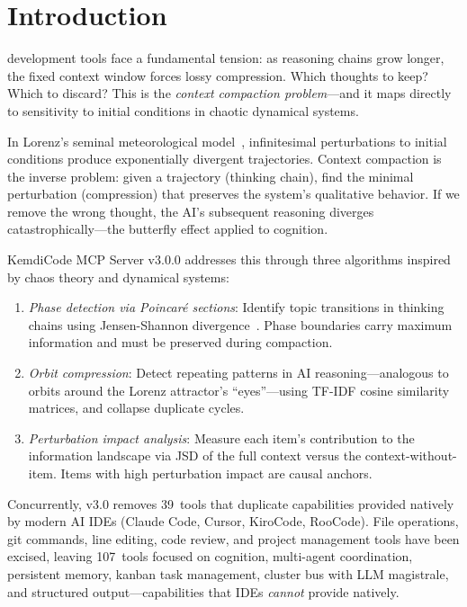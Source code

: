 \documentclass[journal,10pt]{IEEEtran}
\begin{document}
\section{Introduction}
\label{sec:intro}

 development tools face a fundamental tension: as reasoning chains grow longer, the fixed context window forces lossy compression. Which thoughts to keep? Which to discard? This is the \emph{context compaction problem}---and it maps directly to sensitivity to initial conditions in chaotic dynamical systems.

In Lorenz's seminal meteorological model~\cite{lorenz1963}, infinitesimal perturbations to initial conditions produce exponentially divergent trajectories. Context compaction is the inverse problem: given a trajectory (thinking chain), find the minimal perturbation (compression) that preserves the system's qualitative behavior. If we remove the wrong thought, the AI's subsequent reasoning diverges catastrophically---the butterfly effect applied to cognition.

KemdiCode MCP Server v3.0.0 addresses this through three algorithms inspired by chaos theory and dynamical systems:

\begin{enumerate}[nosep,label=(\roman*)]
  \item \emph{Phase detection via Poincar\'{e} sections}: Identify topic transitions in thinking chains using Jensen-Shannon divergence~\cite{lin1991}. Phase boundaries carry maximum information and must be preserved during compaction.
  \item \emph{Orbit compression}: Detect repeating patterns in AI reasoning---analogous to orbits around the Lorenz attractor's ``eyes''---using TF-IDF cosine similarity matrices, and collapse duplicate cycles.
  \item \emph{Perturbation impact analysis}: Measure each item's contribution to the information landscape via JSD of the full context versus the context-without-item. Items with high perturbation impact are causal anchors.
\end{enumerate}

Concurrently, v3.0 removes 39~tools that duplicate capabilities provided natively by modern AI IDEs (Claude Code, Cursor, KiroCode, RooCode). File operations, git commands, line editing, code review, and project management tools have been excised, leaving 107~tools focused on cognition, multi-agent coordination, persistent memory, kanban task management, cluster bus with LLM magistrale, and structured output---capabilities that IDEs \emph{cannot} provide natively.
\end{document}
